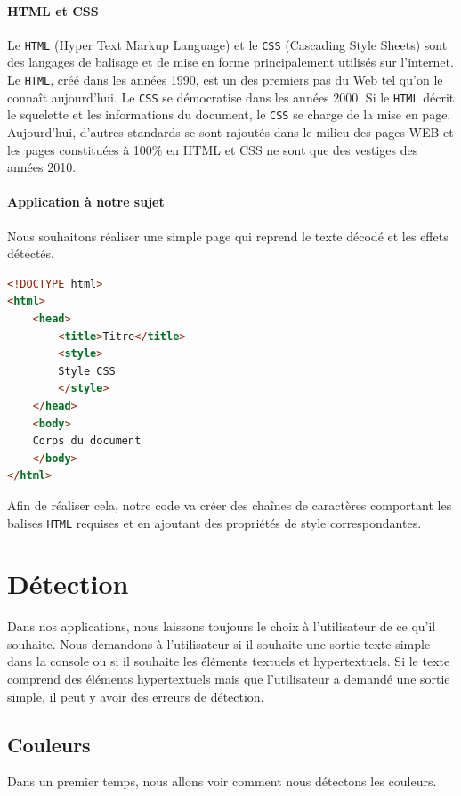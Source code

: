 \documentclass[a4paper,12pt,titlepage]{report}
\begin{document}
	\paragraph{HTML et CSS} Le \texttt{HTML} (Hyper Text Markup Language) et le \texttt{CSS} (Cascading Style Sheets) sont des langages de balisage et de mise en forme principalement utilisés sur l'internet. Le \texttt{HTML}, créé dans les années 1990, est un des premiers pas du Web tel qu'on le connaît aujourd'hui. Le \texttt{CSS} se démocratise dans les années 2000. Si le \texttt{HTML} décrit le squelette et les informations du document, le \texttt{CSS} se charge de la mise en page. Aujourd'hui, d'autres standards se sont rajoutés dans le milieu des pages WEB et les pages constituées à 100\% en HTML et CSS ne sont que des vestiges des années 2010.\newpage
	\paragraph{Application à notre sujet} Nous souhaitons réaliser une simple page qui reprend le texte décodé et les effets détectés.
\begin{lstlisting}[caption={Structure de base du HTML},language=HTML]
<!DOCTYPE html>
<html>
	<head>
		<title>Titre</title>
		<style>
		Style CSS
		</style>
	</head>
	<body>
	Corps du document
	</body>
</html>
\end{lstlisting}
	Afin de réaliser cela, notre code va créer des chaînes de caractères comportant les balises \texttt{HTML} requises et en ajoutant des propriétés de style correspondantes.
	\section{Détection}
	Dans nos applications, nous laissons toujours le choix à l'utilisateur de ce qu'il souhaite. Nous demandons à l'utilisateur si il souhaite une sortie texte simple dans la console ou si il souhaite les éléments textuels et hypertextuels. Si le texte comprend des éléments hypertextuels mais que l'utilisateur a demandé une sortie simple, il peut y avoir des erreurs de détection.
	\subsection{Couleurs}
	Dans un premier temps, nous allons voir comment nous détectons les couleurs. 
\end{document}
